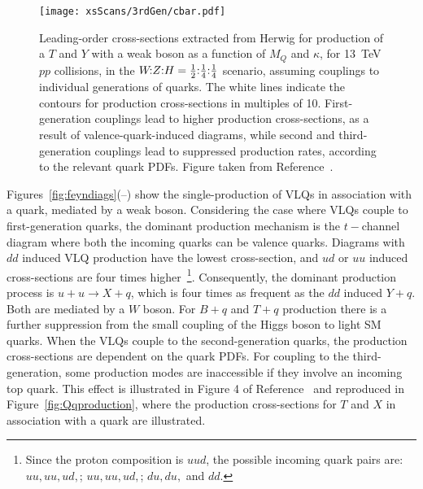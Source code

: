 \begin{figure}[t]
    \texttt{[image: xsScans/3rdGen/cbar.pdf]} %
    \caption{Leading-order cross-sections extracted from Herwig for production of a $T$ and $Y$
      with a weak boson as a function of $M_Q$ and $\kappa$, for \SI{13}{\TeV} $pp$
      collisions, in the $\text{$W\!$:$Z$:$H$} = \text{$\tfrac{1}{2}$:$\tfrac{1}{4}$:$\tfrac{1}{4}$}$ scenario, assuming couplings to individual
      generations of quarks.  The white lines indicate the contours for production
      cross-sections in multiples of 10. First-generation couplings lead to higher
      production cross-sections, as a result of valence-quark-induced diagrams,
      while second and third-generation couplings lead to suppressed production
      rates, according to the relevant quark PDFs. Figure taken from Reference~\cite{VLQ_contur}.}
    \label{fig:QVproduction}
\end{figure}
Figures~\ref{fig:feyndiags}(--) show the single-production of VLQs in association with a quark, mediated by a weak boson. Considering the case where VLQs couple to first-generation quarks, the dominant production mechanism is the $t-$channel diagram where both the incoming quarks can be valence quarks. Diagrams with $dd$ induced VLQ production have the lowest cross-section, and $ud$ or $uu$ induced cross-sections are four times higher~\footnote{Since the proton composition is $uud$, the possible incoming quark pairs are: $uu, uu, ud,$; $uu, uu, ud,$; $du, du,$ and $dd$.}. Consequently, the dominant production process is $u + u \rightarrow X + q$, which is four times as frequent as the $dd$ induced $Y + q$. Both are mediated by a $W$ boson. For $B + q$ and $T + q$ production there is a further suppression from the small coupling of the Higgs boson to light SM quarks. When the VLQs couple to the second-generation quarks, the production cross-sections are dependent on the quark PDFs. For coupling to the third-generation, some production modes are inaccessible if they involve an incoming top quark. This effect is illustrated in Figure 4 of Reference~\cite{VLQ_contur} and reproduced in Figure~\ref{fig:Qqproduction}, where the production cross-sections for $T$ and $X$ in association with a quark are illustrated.
